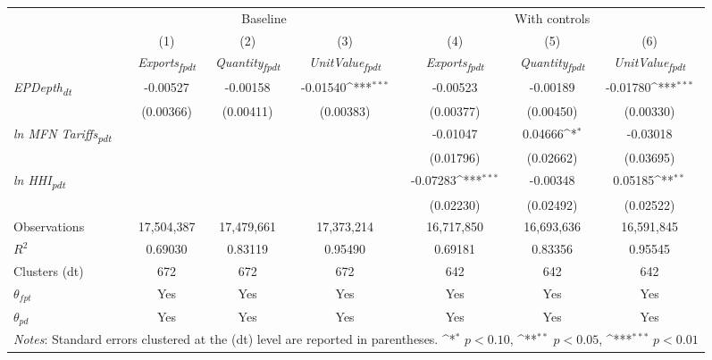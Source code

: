 {
\def\sym#1{\ifmmode^{#1}\else\(^{#1}\)\fi}
\begin{tabular}{l*{6}{c}}
\toprule
&\multicolumn{3}{c}{Baseline}&\multicolumn{3}{c}{With controls}\\\cmidrule(lr){2-4}\cmidrule(lr){5-7}
&(1)&(2)&(3)&(4)&(5)&(6)\\
&\textit{Exports\textsubscript{fpdt}}&\textit{Quantity\textsubscript{fpdt}}&\textit{UnitValue\textsubscript{fpdt}}&\textit{Exports\textsubscript{fpdt}}&\textit{Quantity\textsubscript{fpdt}}&\textit{UnitValue\textsubscript{fpdt}}\\
\midrule
\textit{EPDepth\textsubscript{dt}} & -0.00527 & -0.00158 & -0.01540\sym{***} & -0.00523 & -0.00189 & -0.01780\sym{***}\\
 & (0.00366) & (0.00411) & (0.00383) & (0.00377) & (0.00450) & (0.00330)\\
\addlinespace
\textit{ln MFN Tariffs\textsubscript{pdt}} &  &  &  & -0.01047 & 0.04666\sym{*} & -0.03018\\
 &  &  &  & (0.01796) & (0.02662) & (0.03695)\\
\addlinespace
\textit{ln HHI\textsubscript{pdt}} &  &  &  & -0.07283\sym{***} & -0.00348 & 0.05185\sym{**}\\
 &  &  &  & (0.02230) & (0.02492) & (0.02522)\\
\midrule
Observations & 17,504,387 & 17,479,661 & 17,373,214 & 16,717,850 & 16,693,636 & 16,591,845\\
$R^{2}$ & 0.69030 & 0.83119 & 0.95490 & 0.69181 & 0.83356 & 0.95545\\
Clusters (dt) & 672 & 672 & 672 & 642 & 642 & 642\\
$\theta_{fpt}$ & Yes & Yes & Yes & Yes & Yes & Yes\\
$\theta_{pd}$ & Yes & Yes & Yes & Yes & Yes & Yes\\
\bottomrule
\multicolumn{7}{l}{\footnotesize \textit{Notes}: Standard errors clustered at the (dt) level are reported in parentheses. \sym{*} \(p<0.10\), \sym{**} \(p<0.05\), \sym{***} \(p<0.01\)}\\
\end{tabular}
}
